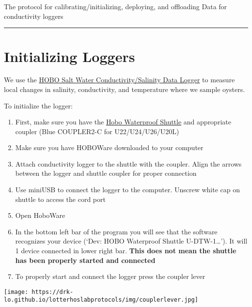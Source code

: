 \documentclass[
  letterpaper,
  DIV=11,
  numbers=noendperiod]{scrreprt}
\begin{document}
The protocol for calibrating/initializing, deploying, and offloading
Data for conductivity loggers

\begin{center}\rule{0.5\linewidth}{0.5pt}\end{center}

\hypertarget{initializing-loggers}{%
\section*{\texorpdfstring{\textbf{Initializing
Loggers}}{Initializing Loggers}}\label{initializing-loggers}}

We use the
\href{http://www.onsetcomp.com/products/data-loggers/u24-002-c}{HOBO
Salt Water Conductivity/Salinity Data Logger} to measure local changes
in salinity, conductivity, and temperature where we sample oysters.

To initialize the logger:

\begin{enumerate}
\def\labelenumi{\arabic{enumi}.}
\item
  First, make sure you have the
  \href{http://www.onsetcomp.com/products/communications/u-dtw-1}{Hobo
  Waterproof Shuttle} and appropriate coupler (Blue COUPLER2-C for
  U22/U24/U26/U20L)
\item
  Make sure you have HOBOWare downloaded to your computer
\item
  Attach conductivity logger to the shuttle with the coupler. Align the
  arrows between the logger and shuttle coupler for proper connection
\item
  Use miniUSB to connect the logger to the computer. Unscrew white cap
  on shuttle to access the cord port
\item
  Open HoboWare
\item
  In the bottom left bar of the program you will see that the software
  recognizes your device (`Dev: HOBO Waterproof Shuttle
  U-DTW-1\ldots{}'). It will 1 device connected in lower right bar.
  \textbf{This does not mean the shuttle has been properly started and
  connected}
\item
  To properly start and connect the logger press the coupler lever
\end{enumerate}

\texttt{[image: https://drk-lo.github.io/lotterhoslabprotocols/img/couplerlever.jpg]}
\end{document}
